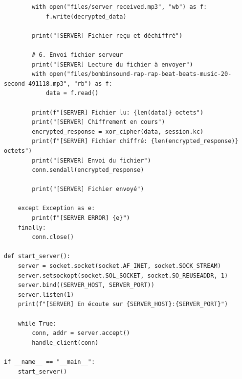 \documentclass[12pt,a4paper]{report}
\begin{document}
\begin{verbatim}
        with open("files/server_received.mp3", "wb") as f:
            f.write(decrypted_data)

        print("[SERVER] Fichier reçu et déchiffré")

        # 6. Envoi fichier serveur
        print("[SERVER] Lecture du fichier à envoyer")
        with open("files/bombinsound-rap-rap-beat-beats-music-20-second-491118.mp3", "rb") as f:
            data = f.read()

        print(f"[SERVER] Fichier lu: {len(data)} octets")
        print("[SERVER] Chiffrement en cours")
        encrypted_response = xor_cipher(data, session.kc)
        print(f"[SERVER] Fichier chiffré: {len(encrypted_response)} octets")
        print("[SERVER] Envoi du fichier")
        conn.sendall(encrypted_response)

        print("[SERVER] Fichier envoyé")

    except Exception as e:
        print(f"[SERVER ERROR] {e}")
    finally:
        conn.close()

def start_server():
    server = socket.socket(socket.AF_INET, socket.SOCK_STREAM)
    server.setsockopt(socket.SOL_SOCKET, socket.SO_REUSEADDR, 1)
    server.bind((SERVER_HOST, SERVER_PORT))
    server.listen(1)
    print(f"[SERVER] En écoute sur {SERVER_HOST}:{SERVER_PORT}")

    while True:
        conn, addr = server.accept()
        handle_client(conn)

if __name__ == "__main__":
    start_server()
\end{verbatim}
\end{document}
